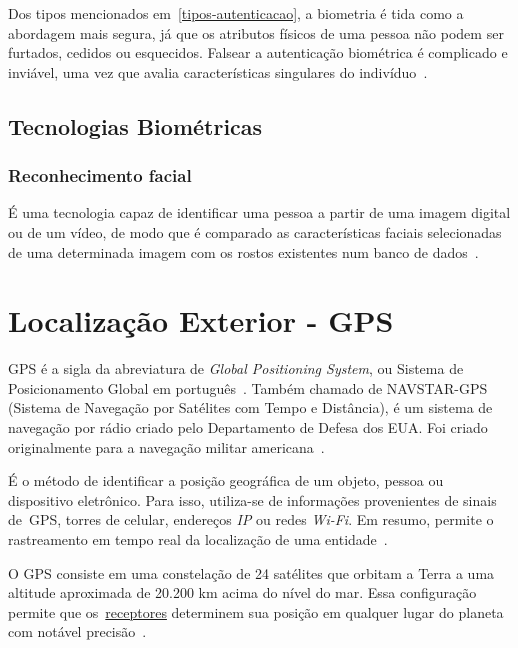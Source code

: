 Dos tipos mencionados em~\ref{tipos-autenticacao}, a biometria é tida como a abordagem mais segura, já que os atributos físicos de uma pessoa não podem ser furtados, cedidos ou esquecidos.
Falsear a autenticação biométrica é complicado e inviável, uma vez que avalia características singulares do indivíduo~\cite{dos2019tecnologias}.

\subsection{Tecnologias Biométricas}\label{subsec:biometria-tecnologias}

\subsubsection{Reconhecimento facial}\label{subsubsec:reconhecimento-facial}
É uma tecnologia capaz de identificar uma pessoa a partir de uma imagem digital ou de um vídeo, de modo que é comparado as características faciais selecionadas de uma determinada imagem com os rostos existentes num banco de dados~\cite{orvalho2019reconhecimento}.




\section{Localização Exterior - GPS}\label{sec:localizacao}
GPS é a sigla da abreviatura de \textit{Global Positioning System}, ou Sistema de Posicionamento Global em português~\cite{gpsdesigning}.
Também chamado de NAVSTAR-GPS (Sistema de Navegação por Satélites com Tempo e Distância), é um sistema de navegação por rádio criado pelo Departamento de Defesa dos EUA. Foi criado originalmente para a navegação militar americana~\cite{novais2014localizaccao}.

É o método de identificar a posição geográfica de um objeto, pessoa ou dispositivo eletrônico.
Para isso, utiliza-se de informações provenientes de sinais de~\hypertarget{receptores}{GPS, torres de celular, endereços \textit{IP} ou redes  \textit{Wi-Fi}}.
Em resumo, permite o rastreamento em tempo real da localização de uma entidade~\cite{da2019sistemas}.

O GPS consiste em uma constelação de 24 satélites que orbitam a Terra a uma altitude aproximada de 20.200 km acima do nível do mar.
Essa configuração permite que os~\hyperlink{receptores}{receptores} determinem sua posição em qualquer lugar do planeta com notável precisão~\cite{el2002introduction}.

